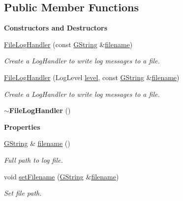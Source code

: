 \subsection*{Public Member Functions}
\begin{Indent}\textbf{ Constructors and Destructors}\par
\begin{DoxyCompactItemize}
\item 
\mbox{\hyperlink{classrev_1_1_file_log_handler_a032982146b91183085989aab43889a80}{File\+Log\+Handler}} (const \mbox{\hyperlink{classrev_1_1_g_string}{G\+String}} \&\mbox{\hyperlink{classrev_1_1_file_log_handler_a3e7f75dec53ac63527608306e70495c0}{filename}})
\begin{DoxyCompactList}\small\item\em Create a Log\+Handler to write log messages to a file. \end{DoxyCompactList}\item 
\mbox{\hyperlink{classrev_1_1_file_log_handler_a62a9455e06ffeb350555e967f982ec8e}{File\+Log\+Handler}} (Log\+Level \mbox{\hyperlink{classrev_1_1_abstract_log_handler_ab27fb35504e3aaa820c4e57f406893ea}{level}}, const \mbox{\hyperlink{classrev_1_1_g_string}{G\+String}} \&\mbox{\hyperlink{classrev_1_1_file_log_handler_a3e7f75dec53ac63527608306e70495c0}{filename}})
\begin{DoxyCompactList}\small\item\em Create a Log\+Handler to write log messages to a file. \end{DoxyCompactList}\item 
\mbox{\label{classrev_1_1_file_log_handler_a75c6b9477a7f973ba489c9b31347e995}} 
{\bfseries $\sim$\+File\+Log\+Handler} ()
\end{DoxyCompactItemize}
\end{Indent}
\begin{Indent}\textbf{ Properties}\par
\begin{DoxyCompactItemize}
\item 
\mbox{\hyperlink{classrev_1_1_g_string}{G\+String}} \& \mbox{\hyperlink{classrev_1_1_file_log_handler_a3e7f75dec53ac63527608306e70495c0}{filename}} ()
\begin{DoxyCompactList}\small\item\em Full path to log file. \end{DoxyCompactList}\item 
void \mbox{\hyperlink{classrev_1_1_file_log_handler_a224769152d428b0fec646c2965bb42e8}{set\+Filename}} (\mbox{\hyperlink{classrev_1_1_g_string}{G\+String}} \&\mbox{\hyperlink{classrev_1_1_file_log_handler_a3e7f75dec53ac63527608306e70495c0}{filename}})
\begin{DoxyCompactList}\small\item\em Set file path. \end{DoxyCompactList}\end{DoxyCompactItemize}
\end{Indent}
